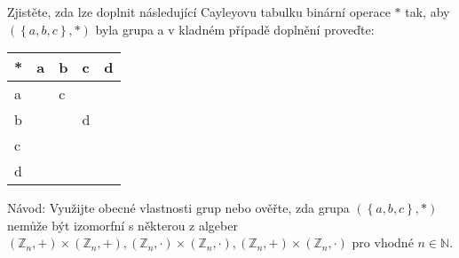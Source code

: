 Zjistěte, zda lze doplnit následující Cayleyovu tabulku binární operace $*$ tak,
aby $\left ( \left \{ a,b,c \right \},* \right )$ byla grupa a v kladném případě
doplnění proveďte:

\begin{table}[ht]
\centering
\begin{tabular}{l|llll}
* & a & b & c & d \\ \hline
a &   & c &   &   \\
b &   &   & d &   \\
c &   &   &   &   \\
d &   &   &   &  
\end{tabular}
\end{table}
Návod: Využijte obecné vlastnosti grup nebo ověřte, zda grupa $\left ( \left \{
  a,b,c \right \},* \right )$ nemůže být izomorfní s některou z algeber $\left (
\mathbb{Z}_{n},+ \right )\times \left ( \mathbb{Z}_{n},+ \right ),\left (
\mathbb{Z}_{n},\cdot \right )\times \left ( \mathbb{Z}_{n},\cdot  \right ),\left
( \mathbb{Z}_{n},+ \right )\times \left ( \mathbb{Z}_{n},\cdot  \right )$
pro vhodné $n \in \mathbb{N}$.
